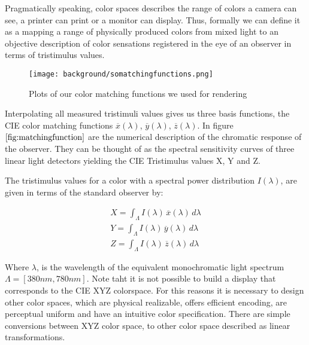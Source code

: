 Pragmatically speaking, color spaces describes the range of colors a camera can see, a printer can print or a monitor can display. Thus, formally we can define it as a mapping a range of physically produced colors from mixed light to an objective description of color
sensations registered in the eye of an observer in terms of tristimulus values. 

\begin{figure}[H]
  \centering
  \texttt{[image: background/somatchingfunctions.png]}
  \caption{Plots of our color matching functions we used for rendering}
  \label{fig:matchingfunction}
\end{figure}

Interpolating all measured tristimuli values gives us three basis functions, the CIE color matching functions $\overline{x}(\lambda)$, $\overline{y}(\lambda)$, $\overline{z}(\lambda)$. In figure $\ref{fig:matchingfunction}$ are the numerical description of the chromatic response of the observer. They can be thought of as the spectral sensitivity curves of three linear light detectors yielding the CIE Tristimulus values X, Y and Z. 

The tristimulus values for a color with a spectral power distribution $I(\lambda)$, are given in terms of the standard observer by:

\begin{align}
    X= \int_{\Lambda} I(\lambda)\,\overline{x}(\lambda)\,d\lambda \nonumber \\
    Y= \int_{\Lambda} I(\lambda)\,\overline{y}(\lambda)\,d\lambda \nonumber \\
    Z= \int_{\Lambda} I(\lambda)\,\overline{z}(\lambda)\,d\lambda
\label{eq:tristimulusvalues}
\end{align}

Where $\lambda$, is the wavelength of the equivalent monochromatic light spectrum $\Lambda = [380nm, 780nm]$. Note taht it is not possible to build a display that corresponds to the CIE XYZ colorspace. For this reasons it is necessary to design other color spaces, which are physical realizable, offers efficient encoding, are perceptual uniform and have an intuitive color specification. There are simple conversions between XYZ color space, to other color space described as linear transformations.

